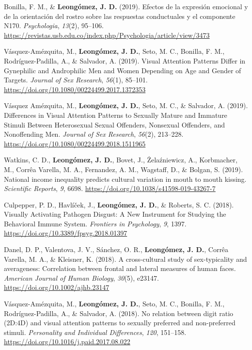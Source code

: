 \documentclass[11pt, a4paper]{awesome-cv}
\begin{document}
\leavevmode\hypertarget{ref-BonillaCarreno2019}{}%
Bonilla, F. M., \& \textbf{Leongómez, J. D.} (2019). Efectos de la expresión emocional y de la orientación del rostro sobre las respuestas conductuales y el componente N170. \emph{Psychologia}, \emph{13}(2), 95--106. \url{https://revistas.usb.edu.co/index.php/Psychologia/article/view/3473}

\leavevmode\hypertarget{ref-Vasquez-Amezquita2017}{}%
Vásquez-Amézquita, M., \textbf{Leongómez, J. D.}, Seto, M. C., Bonilla, F. M., Rodríguez-Padilla, A., \& Salvador, A. (2019). Visual Attention Patterns Differ in Gynephilic and Androphilic Men and Women Depending on Age and Gender of Targets. \emph{Journal of Sex Research}, \emph{56}(1), 85--101. \url{https://doi.org/10.1080/00224499.2017.1372353}

\leavevmode\hypertarget{ref-VasquezAmezquita2019}{}%
Vásquez Amézquita, M., \textbf{Leongómez, J. D.}, Seto, M. C., \& Salvador, A. (2019). Differences in Visual Attention Patterns to Sexually Mature and Immature Stimuli Between Heterosexual Sexual Offenders, Nonsexual Offenders, and Nonoffending Men. \emph{Journal of Sex Research}, \emph{56}(2), 213--228. \url{https://doi.org/10.1080/00224499.2018.1511965}

\leavevmode\hypertarget{ref-Watkins2019}{}%
Watkins, C. D., \textbf{Leongómez, J. D.}, Bovet, J., Żelaźniewicz, A., Korbmacher, M., Corrêa Varella, M. A., Fernandez, A. M., Wagstaff, D., \& Bolgan, S. (2019). National income inequality predicts cultural variation in mouth to mouth kissing. \emph{Scientific Reports}, \emph{9}, 6698. \url{https://doi.org/10.1038/s41598-019-43267-7}

\leavevmode\hypertarget{ref-Culpepper2018}{}%
Culpepper, P. D., Havlíček, J., \textbf{Leongómez, J. D.}, \& Roberts, S. C. (2018). Visually Activating Pathogen Disgust: A New Instrument for Studying the Behavioral Immune System. \emph{Frontiers in Psychology}, \emph{9}, 1397. \url{https://doi.org/10.3389/fpsyg.2018.01397}

\leavevmode\hypertarget{ref-Danel2017}{}%
Danel, D. P., Valentova, J. V., Sánchez, O. R., \textbf{Leongómez, J. D.}, Corrêa Varella, M. A., \& Kleisner, K. (2018). A cross-cultural study of sex-typicality and averageness: Correlation between frontal and lateral measures of human faces. \emph{American Journal of Human Biology}, \emph{30}(5), e23147. \url{https://doi.org/10.1002/ajhb.23147}

\leavevmode\hypertarget{ref-Vasquez-Amezquita2018}{}%
Vásquez-Amézquita, M., \textbf{Leongómez, J. D.}, Seto, M. C., Bonilla, F. M., Rodríguez-Padilla, A., \& Salvador, A. (2018). No relation between digit ratio (2D:4D) and visual attention patterns to sexually preferred and non-preferred stimuli. \emph{Personality and Individual Differences}, \emph{120}, 151--158. \url{https://doi.org/10.1016/j.paid.2017.08.022}
\end{document}
